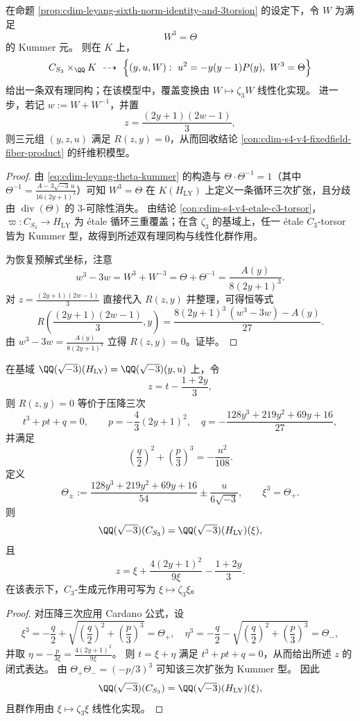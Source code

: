 \begin{proposition}\label{prop:cdim-s4-v4-kummer-model-and-resolvent-recovery}
在命题 \ref{prop:cdim-leyang-sixth-norm-identity-and-3torsion} 的设定下，令 \(W\) 为满足
\[
W^3=\Theta
\]
的 Kummer 元。
则在 \(K\) 上，
\[
C_{S_3}\times_{\QQ}K\ \dashrightarrow\ \Bigl\{(y,u,W):\ u^2=-y(y-1)P(y),\ W^3=\Theta\Bigr\}
\]
给出一条双有理同构；在该模型中，覆盖变换由 \(W\mapsto\zeta_3W\) 线性化实现。
进一步，若记 \(w:=W+W^{-1}\)，并置
\[
z=\frac{(2y+1)(2w-1)}{3},
\]
则三元组 \((y,z,u)\) 满足 \(R(z,y)=0\)，从而回收结论 \ref{con:cdim-s4-v4-fixedfield-fiber-product} 的纤维积模型。
\end{proposition}
\begin{proof}
由 \eqref{eq:cdim-leyang-theta-kummer} 的构造与 \(\Theta\cdot\Theta^{-1}=1\)（其中 \(\Theta^{-1}=\frac{A-3\sqrt{-3}\,u}{16(2y+1)^3}\)）可知 \(W^3=\Theta\) 在 \(K(H_{\mathrm{LY}})\) 上定义一条循环三次扩张，且分歧由 \(\operatorname{div}(\Theta)\) 的 \(3\)-可除性消失。
由结论 \ref{con:cdim-s4-v4-etale-c3-torsor}，\(\varpi:C_{S_3}\to H_{\mathrm{LY}}\) 为 étale 循环三重覆盖；在含 \(\zeta_3\) 的基域上，任一 étale \(C_3\)-torsor 皆为 Kummer 型，故得到所述双有理同构与线性化群作用。
\par
为恢复预解式坐标，注意
\[
w^3-3w=W^3+W^{-3}=\Theta+\Theta^{-1}=\frac{A(y)}{8(2y+1)^3}.
\]
对 \(z=\frac{(2y+1)(2w-1)}{3}\) 直接代入 \(R(z,y)\) 并整理，可得恒等式
\[
R\!\left(\frac{(2y+1)(2w-1)}{3},y\right)=\frac{8(2y+1)^3\,(w^3-3w)-A(y)}{27}.
\]
由 \(w^3-3w=\frac{A(y)}{8(2y+1)^3}\) 立得 \(R(z,y)=0\)。证毕。
\end{proof}

\begin{conclusion}\label{con:cdim-s4-v4-cardano-kummer-explicit}
在基域 \(\QQ(\sqrt{-3})(H_{\mathrm{LY}})=\QQ(\sqrt{-3})(y,u)\) 上，令
\[
z=t-\frac{1+2y}{3},
\]
则 \(R(z,y)=0\) 等价于压降三次
\[
t^{3}+pt+q=0,
\qquad
p=-\frac{4}{3}(2y+1)^{2},\quad
q=-\frac{128y^{3}+219y^{2}+69y+16}{27},
\]
并满足
\[
\left(\frac{q}{2}\right)^2+\left(\frac{p}{3}\right)^3=-\frac{u^{2}}{108}.
\]
定义
\[
\Theta_{\pm}
:=
\frac{128y^{3}+219y^{2}+69y+16}{54}
\pm
\frac{u}{6\sqrt{-3}},
\qquad
\xi^{3}=\Theta_{+}.
\]
则
\[
\QQ(\sqrt{-3})(C_{S_3})
=
\QQ(\sqrt{-3})(H_{\mathrm{LY}})(\xi),
\]
且
\[
z=\xi+\frac{4(2y+1)^2}{9\xi}-\frac{1+2y}{3}.
\]
在该表示下，\(C_3\)-生成元作用可写为 \(\xi\mapsto \zeta_3\xi\)。
\end{conclusion}
\begin{proof}
对压降三次应用 Cardano 公式，设
\[
\xi^{3}=-\frac{q}{2}+\sqrt{\left(\frac{q}{2}\right)^2+\left(\frac{p}{3}\right)^3}=\Theta_{+},
\quad
\eta^{3}=-\frac{q}{2}-\sqrt{\left(\frac{q}{2}\right)^2+\left(\frac{p}{3}\right)^3}=\Theta_{-},
\]
并取 \(\eta=-\frac{p}{3\xi}=\frac{4(2y+1)^2}{9\xi}\)。
则 \(t=\xi+\eta\) 满足 \(t^3+pt+q=0\)，从而给出所述 \(z\) 的闭式表达。
由 \(\Theta_{+}\Theta_{-}=(-p/3)^3\) 可知该三次扩张为 Kummer 型。
因此
\[
\QQ(\sqrt{-3})(C_{S_3})=\QQ(\sqrt{-3})(H_{\mathrm{LY}})(\xi),
\]
且群作用由 \(\xi\mapsto\zeta_3\xi\) 线性化实现。
\end{proof}

